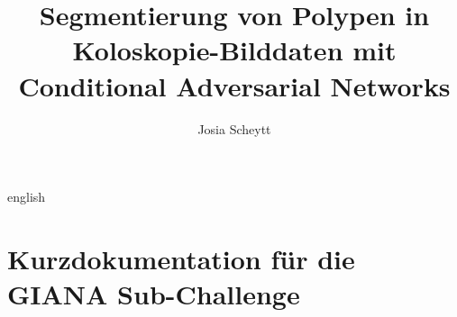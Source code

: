 

\title{Segmentierung von Polypen in Koloskopie-Bilddaten mit Conditional Adversarial Networks}
\author{Josia Scheytt}






\tableofcontents
\clearpage

\begin{abstract}
	\thispagestyle{plain}
	\setcounter{page}{3}
	
\end{abstract}
\clearpage

\begin{otherlanguage*}{english}
\begin{abstract}
	\thispagestyle{plain}
	\setcounter{page}{4}
	
\end{abstract}
\end{otherlanguage*}









\listoffigures
\listoftables
\printglossary[type=\acronymtype,title={Abkürzungsverzeichnis}]
\printbibliography[heading=bibintoc]

\appendix
\chapter{Kurzdokumentation für die GIANA Sub-Challenge}





